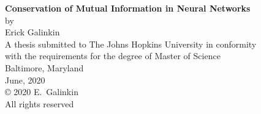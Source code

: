 \thispagestyle{empty}
\baselineskip=18pt
\begin{center}
\vspace*{3\baselineskip}
%
{\bfseries Conservation of Mutual Information in Neural Networks}\\[6\baselineskip]
%
by\\
%
Erick Galinkin\\[3\baselineskip]
%
%
A thesis submitted to The Johns Hopkins University in conformity\\
with the requirements for the degree of Master of Science\\[4\baselineskip]
%
Baltimore, Maryland\\
June, 2020\\[6\baselineskip]
%
{\copyright{} 2020 E.~Galinkin\\
All rights reserved}
%
\end{center}
%
\baselineskip=24pt
\newpage 
